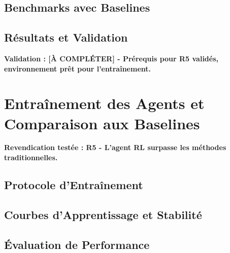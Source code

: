 \subsection{Benchmarks avec Baselines}
\label{subsec:benchmarks_baselines}

\subsection{Résultats et Validation}
\label{subsec:resultats_env_rl}

\textbf{Validation : [À COMPLÉTER] - Prérequis pour R5 validés, environnement prêt pour l'entraînement.}

\section{Entraînement des Agents et Comparaison aux Baselines}
\label{sec:entrainement_agents}

\textbf{Revendication testée : R5 - L'agent RL surpasse les méthodes traditionnelles.}

\subsection{Protocole d'Entraînement}
\label{subsec:protocole_entrainement}

\subsection{Courbes d'Apprentissage et Stabilité}
\label{subsec:courbes_apprentissage}

\subsection{Évaluation de Performance}
\label{subsec:evaluation_performance}

